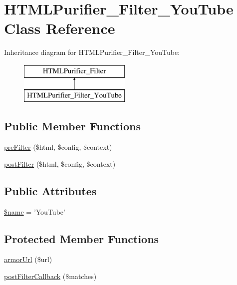 \hypertarget{classHTMLPurifier__Filter__YouTube}{\section{H\+T\+M\+L\+Purifier\+\_\+\+Filter\+\_\+\+You\+Tube Class Reference}
\label{classHTMLPurifier__Filter__YouTube}
}
Inheritance diagram for H\+T\+M\+L\+Purifier\+\_\+\+Filter\+\_\+\+You\+Tube\+:\begin{figure}[H]
\begin{center}
\leavevmode
\includegraphics[height=2.000000cm]{classHTMLPurifier__Filter__YouTube}
\end{center}
\end{figure}
\subsection*{Public Member Functions}
\begin{DoxyCompactItemize}
\item 
\hyperlink{classHTMLPurifier__Filter__YouTube_a79d1a9b2ec5090d91b0056e41af68507}{pre\+Filter} (\$html, \$config, \$context)
\item 
\hyperlink{classHTMLPurifier__Filter__YouTube_ad0c8c43116956c0066afe2be6ee367c0}{post\+Filter} (\$html, \$config, \$context)
\end{DoxyCompactItemize}
\subsection*{Public Attributes}
\begin{DoxyCompactItemize}
\item 
\hyperlink{classHTMLPurifier__Filter__YouTube_a558fc2c5f2a44bc705f0a6179d8cf160}{\$name} = 'You\+Tube'
\end{DoxyCompactItemize}
\subsection*{Protected Member Functions}
\begin{DoxyCompactItemize}
\item 
\hyperlink{classHTMLPurifier__Filter__YouTube_a738a0daadbd5141d6871321dd3075b34}{armor\+Url} (\$url)
\item 
\hyperlink{classHTMLPurifier__Filter__YouTube_a8a9ee53cdde03b70e6dd6e84c0d61220}{post\+Filter\+Callback} (\$matches)
\end{DoxyCompactItemize}


